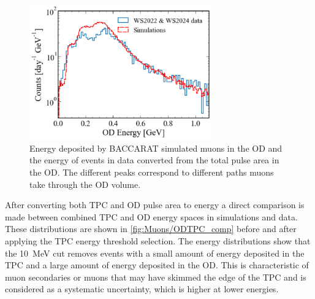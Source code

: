 \begin{figure}[h!]
    \centering
    \includegraphics[width=0.7\textwidth]{figures/Muons/OD_comparison.pdf}
    \caption[Energy deposited by BACCARAT simulated muons in the OD and the energy of events in data converted from the total pulse area in the OD.]{Energy deposited by BACCARAT simulated muons in the OD and the energy of events in data converted from the total pulse area in the OD. The different peaks correspond to different paths muons take through the OD volume.}
    \label{fig:Muons/OD_comp}
\end{figure}
After converting both TPC and OD pulse area to energy a direct comparison is made between combined TPC and OD energy spaces in simulations and data. These distributions are shown in \autoref{fig:Muons/ODTPC_comp} before and after applying the TPC energy threshold selection.
The energy distributions show that the 10~MeV cut removes events with a small amount of energy deposited in the TPC and a large amount of energy deposited in the OD. This is characteristic of muon secondaries or muons that may have skimmed the edge of the TPC and is considered as a systematic uncertainty, which is higher at lower energies.
